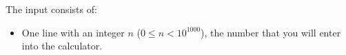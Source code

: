 
    The input consists of:
    \begin{itemize}
        \item One line with an integer $n$ ($0 \leq n < 10^{1000}$), the number that you will enter into the calculator.
    \end{itemize}
